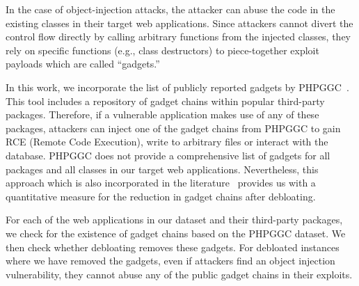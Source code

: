 In the case of object-injection attacks, the attacker can abuse the code in the existing classes in their target web applications. 
Since attackers cannot divert the control flow directly by calling arbitrary functions from the injected classes, they rely on specific functions (e.g., class destructors) to piece-together exploit payloads which are called ``gadgets.'' 


In this work, we incorporate the list of publicly reported gadgets by PHPGGC~\cite{PHPGGC}. 
This tool includes a repository of gadget chains within popular third-party packages. 
Therefore, if a vulnerable application makes use of any of these packages, attackers can inject one of the gadget chains from PHPGGC to gain RCE (Remote Code Execution), write to arbitrary files or interact with the database. 
PHPGGC does not provide a comprehensive list of gadgets for all packages and all classes in our target web applications. 
Nevertheless, this approach which is also incorporated in the literature~\cite{lessismore} provides us with a quantitative measure for the reduction in gadget chains after debloating. 

For each of the web applications in our dataset and their third-party packages, we check for the existence of gadget chains based on the PHPGGC dataset. 
We then check whether debloating removes these gadgets. 
For debloated instances where we have removed the gadgets, even if attackers find an object injection vulnerability, they cannot abuse any of the public gadget chains in their exploits. 
